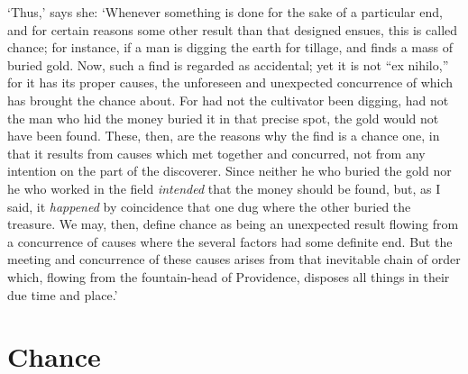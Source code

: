 \documentclass[11pt]{book}
\begin{document}
`Thus,' says she: `Whenever something is done for the sake of a
particular end, and for certain reasons some other result than that
designed ensues, this is \linebreak called chance; for instance, if a man is
digging the earth for tillage, and finds a mass of buried gold. Now,
such a find is regarded as accidental; yet it is not ``ex nihilo,'' for it
has its proper causes, the unforeseen and unexpected concurrence of
which has brought the chance about. For had not the cultivator been
digging, had not the man who hid the money buried it in that precise
spot, the gold would not have been found. These, then, are the reasons
why the find is a chance one, in that it results from causes which met
together and concurred, not from any intention on the part of the
discoverer. Since neither he who buried the gold nor he who worked in
the field \emph{intended} that the money should be found, but, as I said, it
\emph{happened} by coincidence that one dug where the other buried the
treasure. We may, then, define chance as being an unexpected result
flowing from a concurrence of causes where the several factors had some
definite end. But the meeting and concurrence of these causes arises
from that inevitable chain of order which, flowing from the
fountain-head of Providence, disposes all things in their due time and
place.'



\section{Chance}
\end{document}
